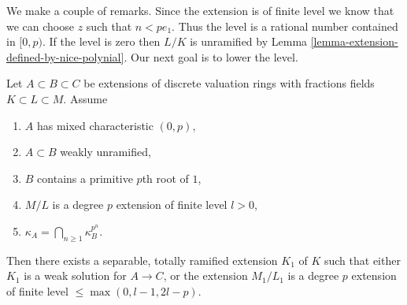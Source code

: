 \medskip\noindent
We make a couple of remarks. Since the extension is of finite level
we know that we can choose $z$ such that $n < pe_1$.
Thus the level is a rational number contained in $[0, p)$.
If the level is zero then $L/K$ is unramified by
Lemma \ref{lemma-extension-defined-by-nice-polynial}.
Our next goal is to lower the level.

\begin{lemma}
\label{lemma-lowering-the-level}
Let $A \subset B \subset C$ be extensions of discrete valuation rings
with fractions fields $K \subset L \subset M$. Assume
\begin{enumerate}
\item $A$ has mixed characteristic $(0, p)$,
\item $A \subset B$ weakly unramified,
\item $B$ contains a primitive $p$th root of $1$,
\item $M/L$ is a degree $p$ extension of finite level $l > 0$,
\item $\kappa_A = \bigcap_{n \geq 1} \kappa_B^{p^n}$.
\end{enumerate}
Then there exists a separable, totally ramified extension $K_1$ of $K$
such that either $K_1$ is a weak solution for $A \to C$, or the extension
$M_1/L_1$ is a degree $p$ extension of finite level
$\leq \max(0, l - 1, 2l - p)$.
\end{lemma}

